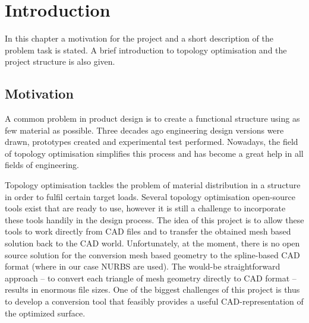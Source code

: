 \chapter{Introduction}
\label{chapter:Introduction}

In this chapter a motivation for the project and a short description of the problem task is stated. A brief introduction to topology optimisation and the project structure is also given.
\section{Motivation}
A common problem in product design is to create a functional structure using as few material as possible. Three decades ago engineering design versions were drawn, prototypes created and experimental test performed. Nowadays, the field of topology optimisation simplifies this process and has become a great help in all fields of engineering. 

Topology optimisation tackles the problem of material distribution in a structure in order to fulfil certain target loads. Several topology optimisation open-source tools exist that are ready to use, however it is still a challenge to incorporate these tools handily in the design process. The idea of this project is to allow these tools to work directly from CAD files and to transfer the obtained mesh based solution back to the CAD world. Unfortunately, at the moment, there is no open source solution for the conversion mesh based geometry to the spline-based CAD format (where in our case NURBS are used). The would-be straightforward approach -- to convert each triangle of mesh geometry directly to CAD format -- results in enormous file sizes. One of the biggest challenges of this project is thus to develop a conversion tool that feasibly provides a useful CAD-representation of the optimized surface.


%
%

